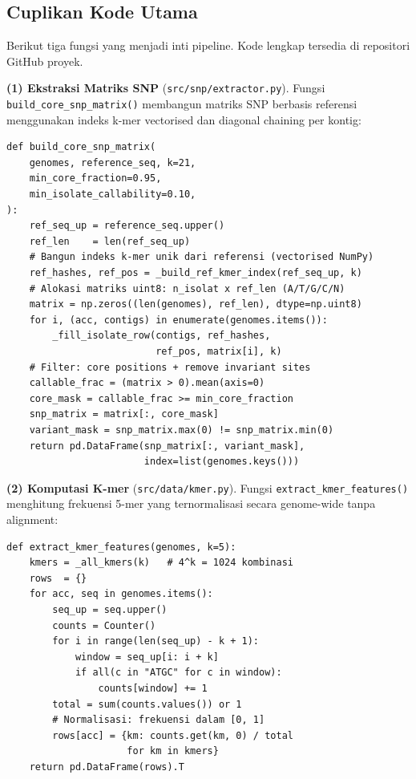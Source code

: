 \documentclass{article}
\begin{document}
\subsection{Cuplikan Kode Utama}

Berikut tiga fungsi yang menjadi inti pipeline. Kode lengkap tersedia di
repositori GitHub proyek.

\textbf{(1) Ekstraksi Matriks SNP} (\texttt{src/snp/extractor.py}).
Fungsi \texttt{build\_core\_snp\_matrix()} membangun matriks SNP berbasis
referensi menggunakan indeks k-mer vectorised dan diagonal chaining per kontig:

\begin{lstlisting}[caption={Ekstraksi matriks core-SNP berbasis referensi.}]
def build_core_snp_matrix(
    genomes, reference_seq, k=21,
    min_core_fraction=0.95,
    min_isolate_callability=0.10,
):
    ref_seq_up = reference_seq.upper()
    ref_len    = len(ref_seq_up)
    # Bangun indeks k-mer unik dari referensi (vectorised NumPy)
    ref_hashes, ref_pos = _build_ref_kmer_index(ref_seq_up, k)
    # Alokasi matriks uint8: n_isolat x ref_len (A/T/G/C/N)
    matrix = np.zeros((len(genomes), ref_len), dtype=np.uint8)
    for i, (acc, contigs) in enumerate(genomes.items()):
        _fill_isolate_row(contigs, ref_hashes,
                          ref_pos, matrix[i], k)
    # Filter: core positions + remove invariant sites
    callable_frac = (matrix > 0).mean(axis=0)
    core_mask = callable_frac >= min_core_fraction
    snp_matrix = matrix[:, core_mask]
    variant_mask = snp_matrix.max(0) != snp_matrix.min(0)
    return pd.DataFrame(snp_matrix[:, variant_mask],
                        index=list(genomes.keys()))
\end{lstlisting}

\textbf{(2) Komputasi K-mer} (\texttt{src/data/kmer.py}).
Fungsi \texttt{extract\_kmer\_features()} menghitung frekuensi 5-mer yang
ternormalisasi secara genome-wide tanpa alignment:

\begin{lstlisting}[caption={Komputasi frekuensi pentanukleotida (5-mer).}]
def extract_kmer_features(genomes, k=5):
    kmers = _all_kmers(k)   # 4^k = 1024 kombinasi
    rows  = {}
    for acc, seq in genomes.items():
        seq_up = seq.upper()
        counts = Counter()
        for i in range(len(seq_up) - k + 1):
            window = seq_up[i: i + k]
            if all(c in "ATGC" for c in window):
                counts[window] += 1
        total = sum(counts.values()) or 1
        # Normalisasi: frekuensi dalam [0, 1]
        rows[acc] = {km: counts.get(km, 0) / total
                     for km in kmers}
    return pd.DataFrame(rows).T
\end{lstlisting}
\end{document}
